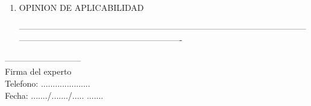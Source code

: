 \documentclass[12pt,a4paper]{article}
\begin{document}
\begin{enumerate}
	\item OPINION DE APLICABILIDAD
	
	---------------------------------------------------------------------------------------------------------------------------------------------------------------- 
\end{enumerate}

\begin{center}
	
	---------------------------\\
	Firma del experto\\
	Telefono: .....................\\
	Fecha: ......./......./.....	.......
\end{center}
\end{document}
